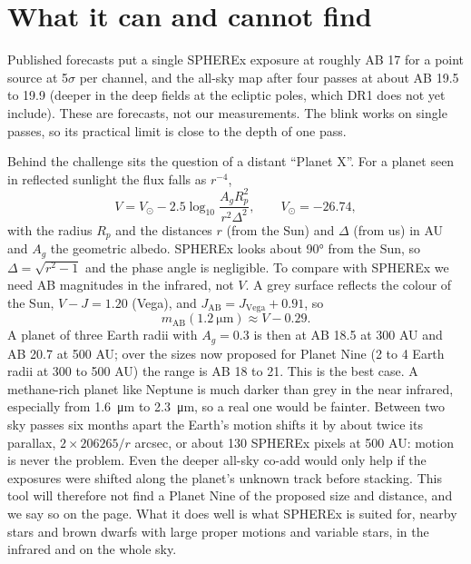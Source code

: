 \documentclass[11pt,a4paper]{article}
\begin{document}
\section{What it can and cannot find}

Published forecasts put a single SPHEREx exposure at roughly AB 17 for a point source at
5$\sigma$ per channel, and the all-sky map after four passes at about AB 19.5 to 19.9 (deeper in
the deep fields at the ecliptic poles, which DR1 does not yet include). These are forecasts, not our measurements. The blink works on single passes,
so its practical limit is close to the depth of one pass.

Behind the challenge sits the question of a distant ``Planet X''. For a planet seen in reflected
sunlight the flux falls as $r^{-4}$,
\begin{equation}
  V = V_\odot - 2.5 \log_{10} \frac{A_g R_p^2}{r^2 \Delta^2},
  \qquad V_\odot = -26.74,
\end{equation}
with the radius $R_p$ and the distances $r$ (from the Sun) and $\Delta$ (from us) in AU and $A_g$
the geometric albedo. SPHEREx looks about \ang{90} from the Sun, so $\Delta = \sqrt{r^2 - 1}$ and
the phase angle is negligible. To compare with SPHEREx we need AB magnitudes in the infrared, not
$V$. A grey surface reflects the colour of the Sun, $V - J = 1.20$ (Vega), and
$J_\mathrm{AB} = J_\mathrm{Vega} + 0.91$, so
\begin{equation}
  m_\mathrm{AB}(\SI{1.2}{\micro\metre}) \approx V - 0.29 .
\end{equation}
A planet of three Earth radii with $A_g = 0.3$ is then at AB 18.5 at 300 AU and AB 20.7 at 500 AU;
over the sizes now proposed for Planet Nine (2 to 4 Earth radii at 300 to 500 AU) the range is
AB 18 to 21. This is the best case. A methane-rich planet like Neptune is much darker than grey in
the near infrared, especially from \SI{1.6}{\micro\metre} to \SI{2.3}{\micro\metre}, so a real
one would be fainter. Between two sky passes six months apart the Earth's motion shifts it by
about twice its parallax, $2 \times 206265/r$ arcsec, or about 130 SPHEREx pixels at 500 AU: motion
is never the problem. Even the deeper all-sky co-add would only help if the exposures were shifted
along the planet's unknown track before stacking. This tool will therefore not find a Planet Nine of
the proposed size and distance, and we say so on the page. What it does well
is what SPHEREx is suited for, nearby stars and brown dwarfs with large proper motions and
variable stars, in the infrared and on the whole sky.
\end{document}
